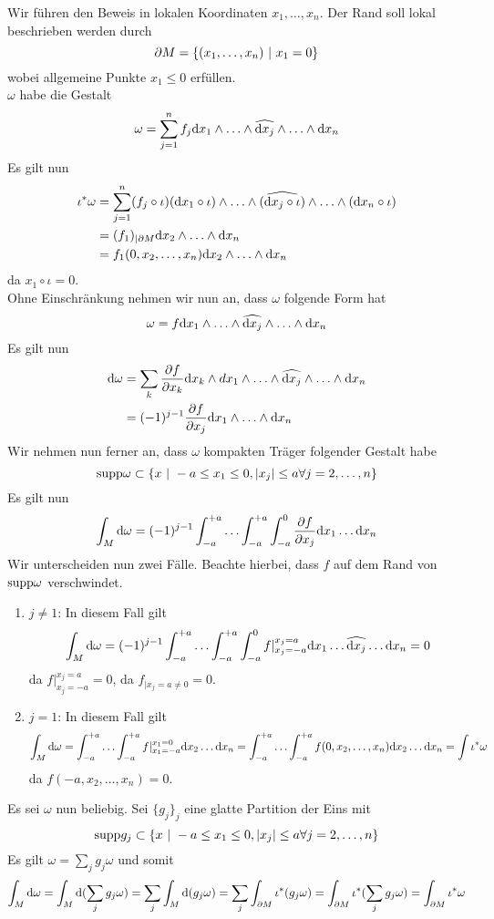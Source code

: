 \begin{Beweis}{}
Wir führen den Beweis in lokalen Koordinaten $x_1, \ldots, x_n$. Der Rand soll lokal beschrieben werden durch
\[ \partial M = \set{ (x_1,\ldots, x_n) }{ x_1 = 0 } \]
wobei allgemeine Punkte $x_1 \leq 0$ erfüllen.\\
$\omega$ habe die Gestalt
\[ \omega = \sum_{j = 1}^n f_j \text{d} x_1 \wedge \ldots \wedge \widehat{\text{d} x_j} \wedge \ldots \wedge \text{d} x_n  \]
Es gilt nun
\begin{align*}
\iota^*\omega &= \sum_{j = 1}^n (f_j \circ \iota) (\text{d}  x_1 \circ \iota) \wedge \ldots \wedge \widehat{(\text{d} x_j\circ \iota)} \wedge \ldots \wedge (\text{d} x_n\circ \iota) \\
&= (f_1)_{|\partial M} \text{d} x_2 \wedge \ldots \wedge \text{d} x_n \\
&= f_1(0, x_2, \ldots, x_n) \text{d} x_2 \wedge \ldots \wedge \text{d} x_n
\end{align*}
da $x_1 \circ \iota = 0$.\\
Ohne Einschränkung nehmen wir nun an, dass $\omega$ folgende Form hat
\[ \omega = f \text{d} x_1 \wedge \ldots \wedge \widehat{\text{d} x_j} \wedge \ldots \wedge \text{d} x_n  \]
Es gilt nun
\begin{align*}
\text{d} \omega &= \sum_k \frac{\partial f}{\partial x_k} \text{d} x_k \wedge d x_1 \wedge \ldots \wedge \widehat{\text{d} x_j} \wedge \ldots \wedge \text{d} x_n\\
 &= (-1)^{j-1} \frac{\partial f}{\partial x_j} \text{d} x_1 \wedge \ldots \wedge \text{d} x_n
\end{align*}
Wir nehmen nun ferner an, dass $\omega$ kompakten Träger folgender Gestalt habe
\[ \supp \omega \subset \set{x}{-a \leq x_1 \leq 0, \bet{x_j}\leq a \forall j = 2,\ldots,n} \] 
Es gilt nun
\[ \int_M \text{d} \omega = (-1)^{j-1} \int_{-a}^{+a} \ldots \int_{-a}^{+a} \int_{-a}^{0} \frac{\partial f}{\partial x_j} \text{d} x_1 \ldots \text{d} x_n \]
Wir unterscheiden nun zwei Fälle. Beachte hierbei, dass $f$ auf dem Rand von $\text{supp} \omega$ verschwindet.
\begin{enumerate}
	\item $j\neq 1$: In diesem Fall gilt
	\[ \int_M \text{d} \omega = (-1)^{j-1} \int_{-a}^{+a} \ldots \int_{-a}^{+a} \int_{-a}^{0} f|_{x_j = -a}^{x_j = a} \text{d} x_1 \ldots \widehat{\text{d} x_j} \ldots \text{d} x_n = 0  \]
	da $f|_{x_j = -a}^{x_j = a} = 0$, da $f_{| x_j = a \neq 0} = 0$.
	\item $j= 1$: In diesem Fall gilt
	\[ \int_M \text{d} \omega = \int_{-a}^{+a} \ldots \int_{-a}^{+a} f|_{x_1 = -a}^{x_1 = 0} \text{d} x_2 \ldots \text{d} x_n = 
	  \int_{-a}^{+a} \ldots \int_{-a}^{+a} f(0, x_2, \ldots, x_n) \text{d} x_2 \ldots \text{d} x_n = \int \iota^*\omega  \]
	da $f(-a, x_2, \ldots, x_n) = 0$.
\end{enumerate}
Es sei $\omega$ nun beliebig. Sei $\{g_j\}_j$ eine glatte Partition der Eins mit
\[ \text{supp} g_j \subset \{ x~|~ -a \leq x_1 \leq 0, \left|x_j\right|\leq a \forall j = 2, \ldots, n \} \]
Es gilt $\omega = \sum_j g_j \omega$ und somit
\[ \int_M \text{d} \omega = 
\int_M \text{d} (\sum_j g_j \omega) = \sum_j  \int_M \text{d} (g_j \omega) = \sum_{j} \int_{\partial M} \iota^*(g_j\omega) = \int_{\partial M}\iota^*(\sum_{j} g_j \omega) = \int_{\partial M} \iota^*\omega \]
\end{Beweis}

